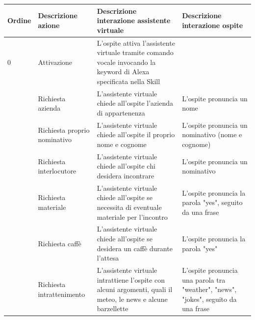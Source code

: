 \documentclass[../DefinizioneDiProdotto_v3.0.0.tex]{subfiles}
\begin{document}
\begin{longtable} [c] {
	>{\centering}p{1.5cm}
	p{2cm}
	p{6cm}
	p{5cm} }
	\toprule
	\textbf{Ordine} & \textbf{Descrizione azione}  & \textbf{Descrizione interazione assistente virtuale}                                                          & \textbf{Descrizione interazione ospite}                                            \\
	\midrule
	\arrayrulecolor{gray}
	0 & Attivazione & L'ospite attiva l'assistente virtuale tramite comando vocale invocando la keyword di Alexa specificata nella Skill \\
	\addlinespace[0.4em]
	\midrule
	\addlinespace[0.4em]
	1               & Richiesta azienda            & L'assistente virtuale chiede all'ospite l'azienda di appartenenza                                             & L'ospite pronuncia un nome                                                         \\
	\addlinespace[0.4em]
	\midrule
	\addlinespace[0.4em]
	2               & Richiesta proprio nominativo & L'assistente virtuale chiede all'ospite il proprio nome e cognome                                             & L'ospite pronuncia un nominativo (nome e cognome)                                  \\
	\addlinespace[0.4em]
	\midrule
	\addlinespace[0.4em]
	3               & Richiesta interlocutore      & L'assistente virtuale chiede all'ospite chi desidera incontrare                                               & L'ospite pronuncia un nominativo                                                   \\
	\addlinespace[0.4em]
	\midrule
	\addlinespace[0.4em]
	4               & Richiesta materiale          & L'assistente virtuale chiede all'ospite se necessita di eventuale materiale per l'incontro                    & L'ospite pronuncia la parola "yes", seguito da una frase                           \\
	\addlinespace[0.4em]
	\midrule
	\addlinespace[0.4em]
	5               & Richiesta caffè             & L'assistente virtuale chiede all'ospite se desidera un caffè durante l'attesa                                & L'ospite pronuncia la parola "yes"                                                 \\
	\addlinespace[0.4em]
	\midrule
	\addlinespace[0.4em]
	6               & Richiesta intrattenimento    & L'assistente virtuale intrattiene l'ospite con alcuni argomenti, quali il meteo, le news e alcune barzellette & L'ospite pronuncia una parola tra "weather", "news", "jokes", seguito da una frase \\

\end{longtable}
\end{document}
